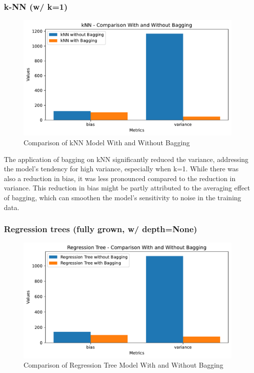 \documentclass[12pt,titlepage]{article}
\begin{document}
\subsubsection{k-NN (w/ k=1)}

\begin{figure}[H]
    \centering
    \includegraphics[scale=0.8]{image/2_5_kNN_comparison.pdf}
    \caption{Comparison of kNN Model With and Without Bagging}
    \label{fig:knn_comparison}
\end{figure}

The application of bagging on kNN significantly reduced the variance, addressing the model's tendency for high variance, especially when k=1. While there was also a reduction in bias, it was less pronounced compared to the reduction in variance. This reduction in bias might be partly attributed to the averaging effect of bagging, which can smoothen the model's sensitivity to noise in the training data.

\subsubsection{Regression trees (fully grown, w/ depth=None)}

\begin{figure}[H]
    \centering
    \includegraphics[scale=0.8]{image/2_5_Regression Tree_comparison.pdf}
    \caption{Comparison of Regression Tree Model With and Without Bagging}
    \label{fig:reg_tree_comparison}
\end{figure}
\end{document}
